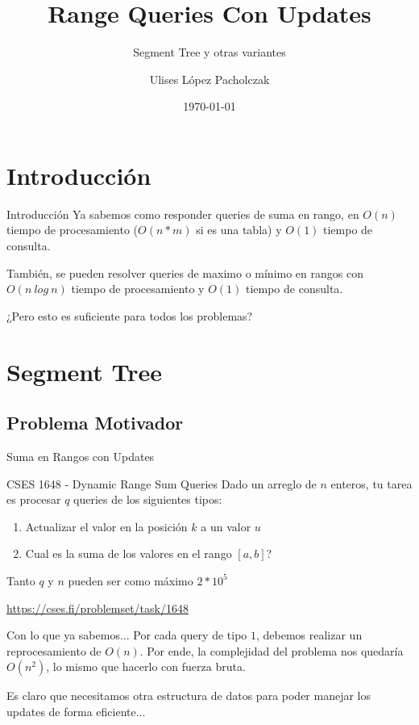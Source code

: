 \documentclass{beamer}
\title{Range Queries Con Updates}
\subtitle{Segment Tree y otras variantes}
\author{Ulises López Pacholczak}
\date{\today}
\begin{document}
\begin{frame}
\titlepage
\end{frame}

\begin{frame}
\tableofcontents
\end{frame}

\section{Introducción}

\begin{frame}{Introducción}
Ya sabemos como responder queries de suma en rango, en $O(n)$ tiempo de procesamiento ($O(n*m)$ si es una tabla) y $O(1)$ tiempo de consulta.

\pause
También, se pueden resolver queries de maximo o mínimo en rangos con $O(n\:log\: n)$ tiempo de procesamiento y $O(1)$ tiempo de consulta.

\pause
¿Pero esto es suficiente para todos los problemas?
\end{frame}

\section{Segment Tree}
\subsection{Problema Motivador}

\begin{frame}{Suma en Rangos con Updates}

\begin{block}{CSES 1648 - Dynamic Range Sum Queries}
Dado un arreglo de $n$ enteros, tu tarea es procesar $q$ queries de los siguientes tipos:
\begin{enumerate}
    \item Actualizar el valor en la posición $k$ a un valor $u$
    \item Cual es la suma de los valores en el rango $[a,b]$?
\end{enumerate}
Tanto $q$ y $n$ pueden ser como máximo $2*10^5$
\end{block}

\url{https://cses.fi/problemset/task/1648}
\end{frame}

\begin{frame}{Con lo que ya sabemos...}
Por cada query de tipo $1$, debemos realizar un reprocesamiento de $O(n)$. Por ende, la complejidad del problema nos quedaría $O(n^2)$, lo mismo que hacerlo con fuerza bruta.

\pause
Es claro que necesitamos otra estructura de datos para poder manejar los updates de forma eficiente...
\end{frame}
\end{document}
